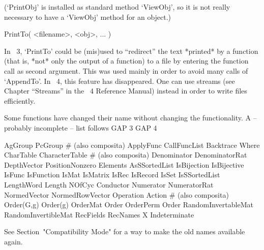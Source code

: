 (`PrintObj' is installed as standard method `ViewObj', so it is
not really necessary to have a `ViewObj' method for an object.)

\>PrintTo( <filename>, <obj>, ... )

In {\GAP}~3, `PrintTo' could be (mis)used to ``redirect'' the text
*printed* by a function (that is, *not* only the output of a function)
to a file by entering the function call as second argument.
This was used mainly in order to avoid many calls of `AppendTo'.
In {\GAP}~4, this feature has disappeared.
One can use streams (see Chapter ``Streams'' in the {\GAP}~4 Reference Manual)
instead in order to write files efficiently.



Some functions have changed their name without changing the
functionality.
A -- probably incomplete -- list follows
\begintt
    GAP 3                   GAP 4

    AgGroup                 PcGroup            # (also composita)
    ApplyFunc               CallFuncList
    Backtrace               Where
    CharTable               CharacterTable     # (also composita)
    Denominator             DenominatorRat
    DepthVector             PositionNonzero
    Elements                AsSSortedList
    IsBijection             IsBijective
    IsFunc                  IsFunction
    IsMat                   IsMatrix
    IsRec                   IsRecord
    IsSet                   IsSSortedList
    LengthWord              Length
    NOfCyc                  Conductor
    Numerator               NumeratorRat
    NormedVector            NormedRowVector
    Operation               Action             # (also composita)
    Order(G,g)              Order(g)
    OrderMat                Order
    OrderPerm               Order
    RandomInvertableMat     RandomInvertibleMat
    RecFields               RecNames
    X                       Indeterminate
\endtt

See Section~"Compatibility Mode" for a way to make the old names
available again.



